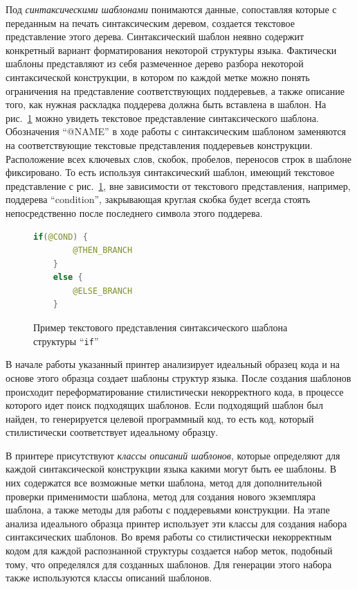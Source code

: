 Под \textit{синтаксическими шаблонами} понимаются данные, сопоставляя которые с переданным на печать синтаксическим деревом, создается текстовое представление этого дерева. Синтаксический шаблон неявно содержит конкретный вариант форматирования некоторой структуры языка. Фактически шаблоны представляют из себя размеченное дерево разбора некоторой синтаксической конструкции, в котором по каждой метке можно понять ограничения на представление соответствующих поддеревьев, а также описание того, как нужная раскладка поддерева должна быть вставлена в шаблон. На рис.~\ref{ifTemplate} можно увидеть текстовое представление синтаксического шаблона. Обозначения ``@NAME'' в ходе работы с синтаксическим шаблоном заменяются на соответствующие текстовые представления поддеревьев конструкции. Расположение всех ключевых слов, скобок, пробелов, переносов строк в шаблоне фиксировано. То есть используя синтаксический шаблон, имеющий текстовое представление с рис.~\ref{ifTemplate}, вне зависимости от текстового представления, например, поддерева ``condition'', закрывающая круглая скобка будет всегда стоять непосредственно после последнего символа этого поддерева.

\begin{figure}[ht]
\begin{lstlisting}[language=Java]
    if(@COND) {
        @THEN_BRANCH
    }
    else {
        @ELSE_BRANCH
    }
\end{lstlisting}

\caption{Пример текстового представления синтаксического шаблона структуры ``\lstinline{if}''}    
\label{ifTemplate}
\end{figure}

В начале работы указанный принтер анализирует идеальный образец кода и на основе этого образца создает шаблоны структур языка. После создания шаблонов происходит переформатирование стилистически некорректного кода, в процессе которого идет поиск подходящих шаблонов. Если подходящий шаблон был найден, то генерируется целевой программный код, то есть код, который стилистически соответствует идеальному образцу.

В принтере присутствуют \textit{классы описаний шаблонов}, которые определяют для каждой синтаксической конструкции языка какими могут быть ее шаблоны. В них содержатся все возможные метки шаблона, метод для дополнительной проверки применимости шаблона, метод для создания нового экземпляра шаблона, а также методы для работы с поддеревьями конструкции. На этапе анализа идеального образца принтер использует эти классы для создания набора синтаксических шаблонов. Во время работы со стилистически некорректным кодом для каждой распознанной структуры создается набор меток, подобный тому, что определялся для созданных шаблонов. Для генерации этого набора также используются классы описаний шаблонов.

